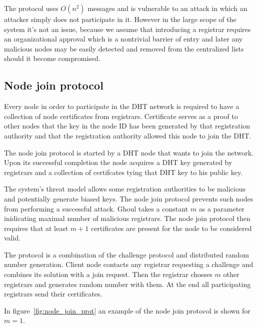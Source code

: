 The protocol uses $O\left(n^2\right)$ messages and is vulnerable to an attack in
which an attacker simply does not participate in it. However in the large scope
of the system it's not an issue, because we assume that introducing a registrar
requires an organizational approval which is a nontrivial barrier of entry and
later any malicious nodes may be easily detected and removed from the
centralized lists should it become compromised.

\subsection{Node join protocol}

Every node in order to participate in the DHT network is required to have a
collection of node certificates from registrars. Certificate serves as a proof
to other nodes that the key in the node ID has been generated by that
registration authority and that the registration authority allowed this node to
join the DHT.

The node join protocol is started by a DHT node that wants to join the network.
Upon its successful completion the node acquires a DHT key generated by
registrars and a collection of certifcates tying that DHT key to his public key.

The system's threat model allows some registration authorities to be malicious
and potentially generate biased keys. The node join protocol prevents such nodes
from performing a successful attack. Ghoul takes a constant $m$ as a parameter 
inidicating maximal number of malicious registrars. The node join protocol then
requires that at least $m+1$ certificates are present for the node to be
considered valid.

The protocol is a combination of the challenge protocol and distributed random
number generation. Client node contacts any registrar requesting a challenge and
combines its solution with a join request. Then the registrar chosses $m$ other
registrars and generates random number with them. At the end all participating
registrars send their certificates.

In figure~\ref{fig:node_join_prot} an example of the node join protocol is shown
for $m=1$.

